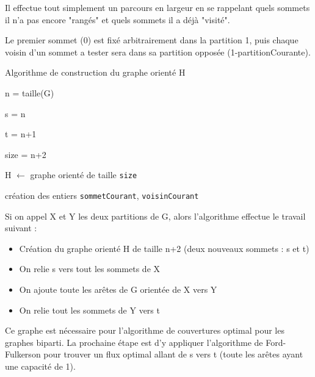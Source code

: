 \documentclass[a4paper,10pt]{article}
\newcommand*{\itemb}{\item[$\bullet$]}
\begin{document}
Il effectue tout simplement un parcours en largeur en se rappelant quels sommets il n'a pas encore "rangés" et quels sommets il a déjà "visité".

Le premier sommet ($0$) est fixé arbitrairement dans la partition 1, puis chaque voisin d'un sommet a tester sera dans sa partition opposée (1-partitionCourante).


\bigskip
\bigskip
\begin{algorithm}[H]
\caption{Algorithme de construction du graphe orienté H}
\BlankLine
n = taille(G)

s = n

t = n+1

size = n+2

H $\leftarrow$ graphe orienté de taille \texttt{size}

création des entiers \texttt{sommetCourant}, \texttt{voisinCourant}




\end{algorithm}
\bigskip

Si on appel X et Y les deux partitions de G, alors l'algorithme effectue le travail suivant :
\begin{itemize}
\itemb Création du graphe orienté H de taille n+2 (deux nouveaux sommets : s et t)
\itemb On relie s vers tout les sommets de X
\itemb On ajoute toute les arêtes de G orientée de X vers Y
\itemb On relie tout les sommets de Y vers t
\end{itemize}

Ce graphe est nécessaire pour l'algorithme de couvertures optimal pour les graphes biparti. La prochaine étape est d'y appliquer l'algorithme de Ford-Fulkerson pour trouver un flux optimal allant de s vers t (toute les arêtes ayant une capacité de 1).
\end{document}
